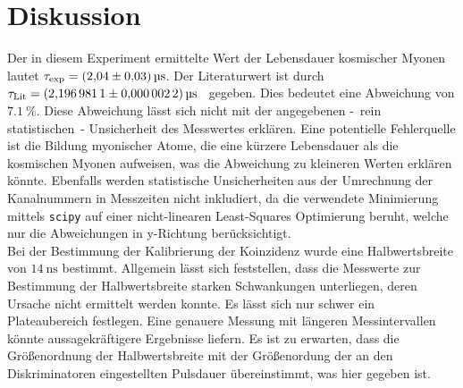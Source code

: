 \section{Diskussion}
\label{sec:Diskussion}
Der in diesem Experiment ermittelte Wert der Lebensdauer kosmischer Myonen lautet $\tau_\text{exp} = \qty{2.04 +- 0.03}{\micro\second}$. Der Literaturwert ist 
durch $\tau_\text{Lit} = \qty{2.1969811+-0.0000022}{\micro\second}$~\cite{PDG:muon} gegeben. Dies bedeutet eine Abweichung von $\qty{7.1}{\percent}$. 
Diese Abweichung lässt sich nicht mit der angegebenen -~rein statistischen~- Unsicherheit des Messwertes erklären. Eine potentielle Fehlerquelle
ist die Bildung myonischer Atome, die eine kürzere Lebensdauer als die kosmischen Myonen aufweisen, was die Abweichung zu kleineren Werten erklären könnte.
Ebenfalls werden statistische Unsicherheiten aus der Umrechnung der Kanalnummern in Messzeiten nicht inkludiert, 
da die verwendete Minimierung mittels \texttt{scipy} auf einer nicht-linearen Least-Squares Optimierung beruht, welche nur die Abweichungen in y-Richtung berücksichtigt.\\ 
Bei der Bestimmung der Kalibrierung der 
Koinzidenz wurde eine Halbwertsbreite von $\qty{14}{\nano\second}$ bestimmt. Allgemein lässt sich feststellen, dass die Messwerte zur Bestimmung der Halbwertsbreite 
starken Schwankungen unterliegen, deren Ursache nicht ermittelt werden konnte. Es lässt sich nur schwer ein Plateaubereich festlegen.
Eine genauere Messung mit längeren Messintervallen könnte aussagekräftigere Ergebnisse liefern. Es ist zu erwarten, dass die Größenordnung der Halbwertsbreite 
mit der Größenordung der an den Diskriminatoren eingestellten Pulsdauer übereinstimmt, was hier gegeben ist.
